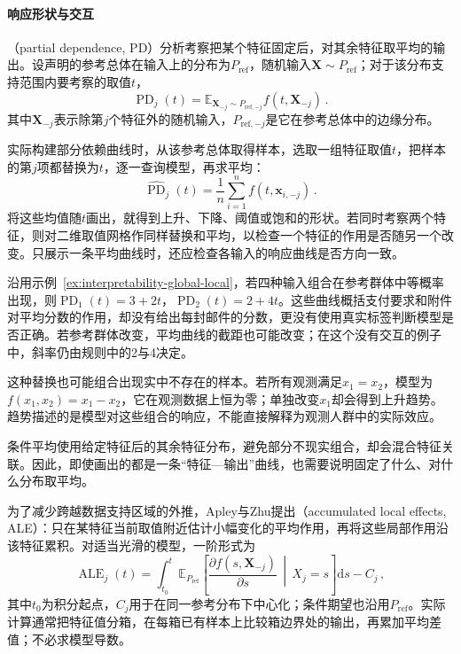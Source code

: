 \paragraph{响应形状与交互}

（partial dependence, PD）分析考察把某个特征固定后，对其余特征取平均的输出。设声明的参考总体在输入上的分布为$P_{\mathrm{ref}}$，随机输入$\bm X\sim P_{\mathrm{ref}}$；对于该分布支持范围内要考察的取值$t$，
\[
 \operatorname{PD}_j(t)
 =\mathbb E_{\bm X_{-j}\sim P_{\mathrm{ref},-j}}
 f(t,\bm X_{-j})\, .
\]
其中$\bm X_{-j}$表示除第$j$个特征外的随机输入，$P_{\mathrm{ref},-j}$是它在参考总体中的边缘分布。

实际构建部分依赖曲线时，从该参考总体取得样本，选取一组特征取值$t$，把样本的第$j$项都替换为$t$，逐一查询模型，再求平均：
\[
 \widehat{\operatorname{PD}}_j(t)
 =\frac1n\sum_{i=1}^n f(t,\bm{x}_{i,-j})\, .
\]
将这些均值随$t$画出，就得到上升、下降、阈值或饱和的形状。若同时考察两个特征，则对二维取值网格作同样替换和平均，以检查一个特征的作用是否随另一个改变。只展示一条平均曲线时，还应检查各输入的响应曲线是否方向一致。

沿用示例~\ref{ex:interpretability-global-local}，若四种输入组合在参考群体中等概率出现，则$\operatorname{PD}_1(t)=3+2t$，$\operatorname{PD}_2(t)=2+4t$。这些曲线概括支付要求和附件对平均分数的作用，却没有给出每封邮件的分数，更没有使用真实标签判断模型是否正确。若参考群体改变，平均曲线的截距也可能改变；在这个没有交互的例子中，斜率仍由规则中的2与4决定。

这种替换也可能组合出现实中不存在的样本。若所有观测满足$x_1=x_2$，模型为$f(x_1,x_2)=x_1-x_2$，它在观测数据上恒为零；单独改变$x_1$却会得到上升趋势。趋势描述的是模型对这些组合的响应，不能直接解释为观测人群中的实际效应。

条件平均使用给定特征后的其余特征分布，避免部分不现实组合，却会混合特征关联。因此，即使画出的都是一条“特征—输出”曲线，也需要说明固定了什么、对什么分布取平均。

为了减少跨越数据支持区域的外推，Apley与Zhu提出（accumulated local effects, ALE）：只在某特征当前取值附近估计小幅变化的平均作用，再将这些局部作用沿该特征累积。对适当光滑的模型，一阶形式为
\begin{equation}
 \operatorname{ALE}_j(t)
 =\int_{t_0}^{t}
 \mathbb E_{P_{\mathrm{ref}}}\!\left[
 \frac{\partial f(s,\bm X_{-j})}{\partial s}
 \,\middle|\,X_j=s\right]\mathrm ds-C_j\, ,
 \label{eq:interpretability-ale}
\end{equation}
其中$t_0$为积分起点，$C_j$用于在同一参考分布下中心化；条件期望也沿用$P_{\mathrm{ref}}$。实际计算通常把特征值分箱，在每箱已有样本上比较箱边界处的输出，再累加平均差值；不必求模型导数。

